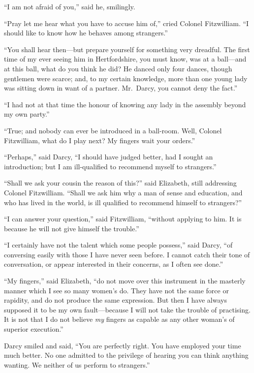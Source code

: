 ``I am not afraid of you,'' said he, smilingly.

``Pray let me hear what you have to accuse him of,'' cried
Colonel Fitzwilliam.  ``I should like to know how he behaves
among strangers.''

``You shall hear then---but prepare yourself for something very
dreadful.  The first time of my ever seeing him in Hertfordshire,
you must know, was at a ball---and at this ball, what do you
think he did?  He danced only four dances, though gentlemen
were scarce; and, to my certain knowledge, more than one
young lady was sitting down in want of a partner.  Mr.\ Darcy,
you cannot deny the fact.''

``I had not at that time the honour of knowing any lady in the
assembly beyond my own party.''

``True; and nobody can ever be introduced in a ball-room.  Well,
Colonel Fitzwilliam, what do I play next?  My fingers wait your
orders.''

``Perhaps,'' said Darcy, ``I should have judged better, had I
sought an introduction; but I am ill-qualified to recommend
myself to strangers.''

``Shall we ask your cousin the reason of this?'' said Elizabeth,
still addressing Colonel Fitzwilliam.  ``Shall we ask him why a
man of sense and education, and who has lived in the world, is
ill qualified to recommend himself to strangers?''

``I can answer your question,'' said Fitzwilliam, ``without
applying to him.  It is because he will not give himself the
trouble.''

``I certainly have not the talent which some people possess,'' said
Darcy, ``of conversing easily with those I have never seen before.
I cannot catch their tone of conversation, or appear interested
in their concerns, as I often see done.''

``My fingers,'' said Elizabeth, ``do not move over this instrument
in the masterly manner which I see so many women's do.  They
have not the same force or rapidity, and do not produce the
same expression.  But then I have always supposed it to be my
own fault---because I will not take the trouble of practising.
It is not that I do not believe \emph{my} fingers as capable as any
other woman's of superior execution.''

Darcy smiled and said, ``You are perfectly right.  You have
employed your time much better.  No one admitted to the
privilege of hearing you can think anything wanting.  We neither
of us perform to strangers.''

